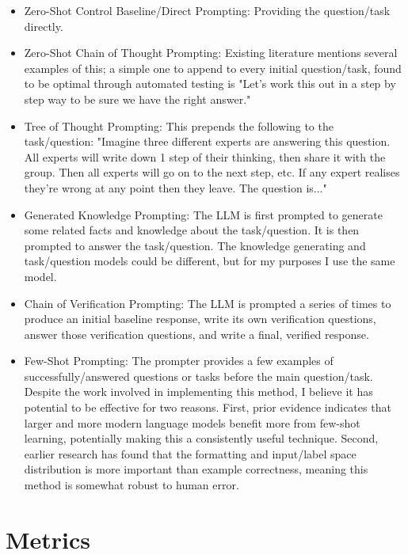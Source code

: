 \documentclass[11pt]{article}
\begin{document}
\begin{itemize}
  \item Zero-Shot Control Baseline/Direct Prompting: Providing the question/task directly.
  \item Zero-Shot Chain of Thought Prompting: Existing literature mentions several examples of this; a simple one to append to every initial question/task, found to be optimal through automated testing is "Let's work this out in a step by step way to be sure we have the right answer." \cite{hebenstreit_automatically_2023, zhou_large_2022}
  \item Tree of Thought Prompting: This prepends the following to the task/question: "Imagine three different experts are answering this question. All experts will write down 1 step of their thinking, then share it with the group. Then all experts will go on to the next step, etc. If any expert realises they're wrong at any point then they leave. The question is..." \cite{hulbert_using_2023}
  \item Generated Knowledge Prompting: The LLM is first prompted to generate some related facts and knowledge about the task/question. It is then prompted to answer the task/question. \cite{liu_generated_2022} The knowledge generating and task/question models could be different, but for my purposes I use the same model.
  \item Chain of Verification Prompting: The LLM is prompted a series of times to produce an initial baseline response, write its own verification questions, answer those verification questions, and write a final, verified response. \cite{dhuliawala_chain--verification_2023}
  \item Few-Shot Prompting: The prompter provides a few examples of successfully/answered questions or tasks before the main question/task. Despite the work involved in implementing this method, I believe it has potential to be effective for two reasons. First, prior evidence indicates that larger and more modern language models benefit more from few-shot learning, potentially making this a consistently useful technique. \cite{brown_language_2020} Second, earlier research has found that the formatting and input/label space distribution is more important than example correctness, meaning this method is somewhat robust to human error. \cite{min_rethinking_2022}
\end{itemize}

\section*{Metrics}
\end{document}
